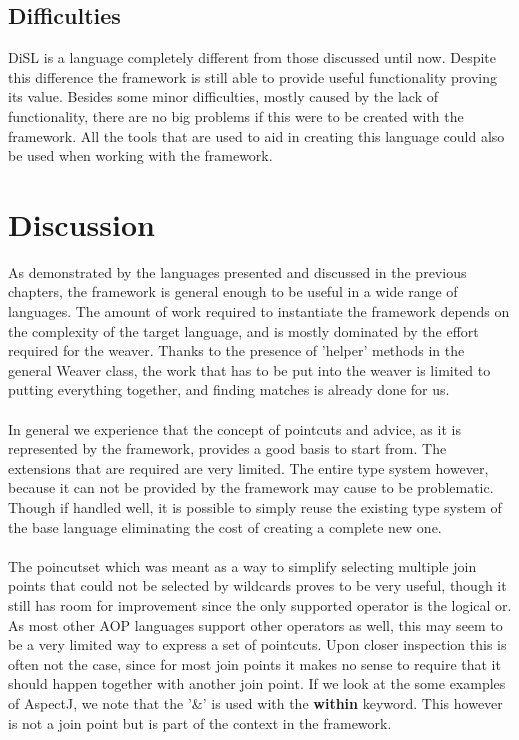 \documentclass[a4paper]{report}
\begin{document}
\section{Difficulties}
DiSL is a language completely different from those discussed until now. Despite this difference the framework is still able to provide useful functionality proving its value. Besides some minor difficulties, mostly caused by the lack of functionality, there are no big problems if this were to be created with the framework. All the tools that are used to aid in creating this language could also be used when working with the framework.

\chapter{Discussion}
\label{chap:Discussion}
As demonstrated by the languages presented and discussed in the previous chapters, the framework is general enough to be useful in a wide range of languages. The amount of work required to instantiate the framework depends on the complexity of the target language, and is mostly dominated by the effort required for the weaver. Thanks to the presence of 'helper' methods in the general Weaver class, the work that has to be put into the weaver is limited to putting everything together, and finding matches is already done for us.\\
\\
In general we experience that the concept of pointcuts and advice, as it is represented by the framework, provides a good basis to start from. The extensions that are required are very limited. The entire type system however, because it can not be provided by the framework may cause to be problematic. Though if handled well, it is possible to simply reuse the existing type system of the base language eliminating the cost of creating a complete new one.\\
\\
The poincutset which was meant as a way to simplify selecting multiple join points that could not be selected by wildcards proves to be very useful, though it still has room for improvement since the only supported operator is the logical or. As most other AOP languages support other operators as well, this may seem to be a very limited way to express a set of pointcuts. Upon closer inspection this is often not the case, since for most join points it makes no sense to require that it should happen together with another join point. If we look at the some examples of AspectJ, we note that the '\&' is used with the \textbf{within} keyword. This however is not a join point but is part of the context in the framework.\\
\end{document}

